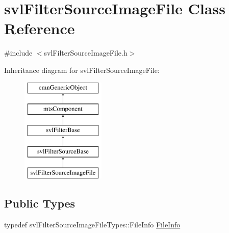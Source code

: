 \hypertarget{classsvl_filter_source_image_file}{}\section{svl\+Filter\+Source\+Image\+File Class Reference}
\label{classsvl_filter_source_image_file}


{\ttfamily \#include $<$svl\+Filter\+Source\+Image\+File.\+h$>$}

Inheritance diagram for svl\+Filter\+Source\+Image\+File\+:\begin{figure}[H]
\begin{center}
\leavevmode
\includegraphics[height=5.000000cm]{d3/dcc/classsvl_filter_source_image_file}
\end{center}
\end{figure}
\subsection*{Public Types}
\begin{DoxyCompactItemize}
\item 
typedef svl\+Filter\+Source\+Image\+File\+Types\+::\+File\+Info \hyperlink{classsvl_filter_source_image_file_a0acade731f76b2a1adc5a6a43417c4f4}{File\+Info}
\end{DoxyCompactItemize}

